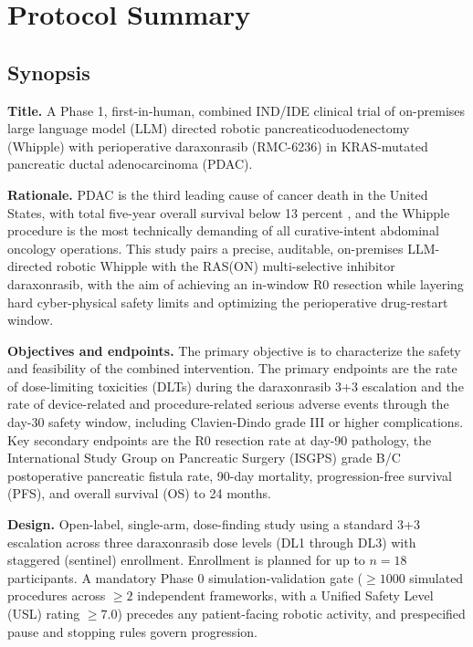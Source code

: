 \section{Protocol Summary}

\subsection{Synopsis}

\textbf{Title.} A Phase 1, first-in-human, combined IND/IDE clinical trial of
on-premises large language model (LLM) directed robotic pancreaticoduodenectomy
(Whipple) with perioperative daraxonrasib (RMC-6236) in KRAS-mutated pancreatic
ductal adenocarcinoma (PDAC).

\textbf{Rationale.} PDAC is the third leading cause of cancer death in the United
States, with total five-year overall survival below 13 percent
\cite{Siegel2025}, and the Whipple procedure is the most technically demanding
of all curative-intent abdominal oncology operations. This study pairs a precise,
auditable, on-premises LLM-directed robotic Whipple with the RAS(ON)
multi-selective inhibitor daraxonrasib, with the aim of achieving an in-window R0
resection while layering hard cyber-physical safety limits and optimizing the
perioperative drug-restart window.

\textbf{Objectives and endpoints.} The primary objective is to characterize the
safety and feasibility of the combined intervention. The primary endpoints are
the rate of dose-limiting toxicities (DLTs) during the daraxonrasib 3+3
escalation and the rate of device-related and procedure-related serious adverse
events through the day-30 safety window, including Clavien-Dindo grade III or
higher complications. Key secondary endpoints are the R0 resection rate at day-90
pathology, the International Study Group on Pancreatic Surgery (ISGPS) grade B/C
postoperative pancreatic fistula rate, 90-day mortality, progression-free
survival (PFS), and overall survival (OS) to 24 months.

\textbf{Design.} Open-label, single-arm, dose-finding study using a standard 3+3
escalation across three daraxonrasib dose levels (DL1 through DL3) with staggered
(sentinel) enrollment. Enrollment is planned for up to $n=18$ participants. A
mandatory Phase 0 simulation-validation gate ($\geq 1000$ simulated procedures
across $\geq 2$ independent frameworks, with a Unified Safety Level (USL) rating
$\geq 7.0$) precedes any patient-facing robotic activity, and prespecified pause
and stopping rules govern progression.

